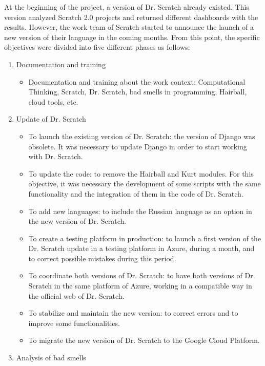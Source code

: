 At the beginning of the project, a version of Dr. Scratch already existed. This version analyzed Scratch 2.0 projects and returned different dashboards with the results. However, the work team of Scratch started to announce the launch of a new version of their language in the coming months. From this point, the specific objectives were divided into five different phases as follows:

\begin{enumerate}
    \item Documentation and training
    \begin{itemize}
        \item Documentation and training about the work context: Computational Thinking, Scratch, Dr. Scratch, bad smells in programming, Hairball, cloud tools, etc.
    \end{itemize}
    \item Update of Dr. Scratch
    \begin{itemize}
        \item To launch the existing version of Dr. Scratch: the version of Django was obsolete. It was necessary to update Django in order to start working with Dr. Scratch. 
        \item To update the code: to remove the Hairball and Kurt modules. For this objective, it was necessary the development of some scripts with the same functionality and the integration of them in the code of Dr. Scratch.
        \item To add new languages: to include the Russian language as an option in the new version of Dr. Scratch.
        \item To create a testing platform in production: to launch a first version of the Dr. Scratch update in a testing platform in Azure, during a month, and to correct possible mistakes during this period.
        \item To coordinate both versions of Dr. Scratch: to have both versions of Dr. Scratch in the same platform of Azure, working in a compatible way in the official web of Dr. Scratch.
        \item To stabilize and maintain the new version: to correct errors and to improve some functionalities.
        \item To migrate the new version of Dr. Scratch to the Google Cloud Platform.
    \end{itemize}
    \item Analysis of bad smells
    \begin{itemize}

\end{itemize}
\end{enumerate}
